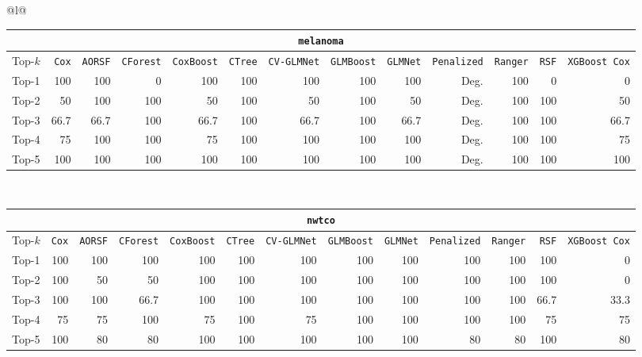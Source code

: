 \begin{longtable}{@{}l@{}}
\begin{tabular}{@{}l*{12}{r}@{}}
\multicolumn{13}{c}{\texttt{melanoma}} \\
\midrule
Top-$k$ & \texttt{Cox} & \texttt{AORSF} & \texttt{CForest} & \texttt{CoxBoost} & \texttt{CTree} & \texttt{CV-GLMNet} & \texttt{GLMBoost} & \texttt{GLMNet} & \texttt{Penalized} & \texttt{Ranger} & \texttt{RSF} & \texttt{XGBoost Cox} \\
\midrule
Top-1 & 100 & 100 & 0 & 100 & 100 & 100 & 100 & 100 & Deg. & 100 & 0 & 0 \\
Top-2 & 50 & 100 & 100 & 50 & 100 & 50 & 100 & 50 & Deg. & 100 & 100 & 50 \\
Top-3 & 66.7 & 66.7 & 100 & 66.7 & 100 & 66.7 & 100 & 66.7 & Deg. & 100 & 100 & 66.7 \\
Top-4 & 75 & 100 & 100 & 75 & 100 & 100 & 100 & 100 & Deg. & 100 & 100 & 75 \\
Top-5 & 100 & 100 & 100 & 100 & 100 & 100 & 100 & 100 & Deg. & 100 & 100 & 100 \\
\end{tabular} \\
\midrule

\begin{tabular}{@{}l*{12}{r}@{}}
\multicolumn{13}{c}{\texttt{nwtco}} \\
\midrule
Top-$k$ & \texttt{Cox} & \texttt{AORSF} & \texttt{CForest} & \texttt{CoxBoost} & \texttt{CTree} & \texttt{CV-GLMNet} & \texttt{GLMBoost} & \texttt{GLMNet} & \texttt{Penalized} & \texttt{Ranger} & \texttt{RSF} & \texttt{XGBoost Cox} \\
\midrule
Top-1 & 100 & 100 & 100 & 100 & 100 & 100 & 100 & 100 & 100 & 100 & 100 & 0 \\
Top-2 & 100 & 50 & 50 & 100 & 100 & 100 & 100 & 100 & 100 & 100 & 100 & 0 \\
Top-3 & 100 & 100 & 66.7 & 100 & 100 & 100 & 100 & 100 & 100 & 100 & 66.7 & 33.3 \\
Top-4 & 75 & 75 & 100 & 75 & 100 & 75 & 100 & 100 & 100 & 100 & 75 & 75 \\
Top-5 & 100 & 80 & 80 & 100 & 100 & 100 & 100 & 100 & 80 & 80 & 100 & 80 \\
\end{tabular} \\
\midrule


\end{longtable}
